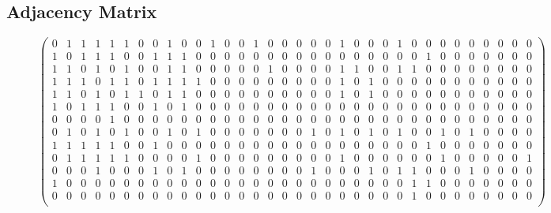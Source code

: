 \documentclass[runningheads]{llncs}
\begin{document}
\subsection{Adjacency Matrix}
\begin{figure}
\[\begin{pmatrix}
0 & 1 & 1 & 1 & 1 & 1 & 0 & 0 & 1 & 0 & 0 & 1 & 0 & 0 & 1 & 0 & 0 & 0 & 0 & 0 & 1 & 0 & 0 & 0 & 1 & 0 & 0 & 0 & 0 & 0 & 0 & 0 & 0 & 0 \\
1 & 0 & 1 & 1 & 1 & 0 & 0 & 1 & 1 & 1 & 0 & 0 & 0 & 0 & 0 & 0 & 0 & 0 & 0 & 0 & 0 & 0 & 0 & 0 & 0 & 0 & 1 & 0 & 0 & 0 & 0 & 0 & 0 & 0 \\
1 & 1 & 0 & 1 & 0 & 1 & 0 & 0 & 1 & 1 & 0 & 0 & 0 & 0 & 0 & 1 & 0 & 0 & 0 & 0 & 1 & 1 & 0 & 0 & 1 & 1 & 0 & 0 & 0 & 0 & 0 & 0 & 0 & 0 \\
1 & 1 & 1 & 0 & 1 & 1 & 0 & 1 & 1 & 1 & 1 & 0 & 0 & 0 & 0 & 0 & 0 & 0 & 0 & 0 & 1 & 0 & 1 & 0 & 0 & 0 & 0 & 0 & 0 & 0 & 0 & 0 & 0 & 0 \\
1 & 1 & 0 & 1 & 0 & 1 & 1 & 0 & 1 & 1 & 0 & 0 & 0 & 0 & 0 & 0 & 0 & 0 & 0 & 0 & 1 & 0 & 1 & 0 & 0 & 0 & 0 & 0 & 0 & 0 & 0 & 0 & 0 & 0 \\
1 & 0 & 1 & 1 & 1 & 0 & 0 & 1 & 0 & 1 & 0 & 0 & 0 & 0 & 0 & 0 & 0 & 0 & 0 & 0 & 0 & 0 & 0 & 0 & 0 & 0 & 0 & 0 & 0 & 0 & 0 & 0 & 0 & 0 \\
0 & 0 & 0 & 0 & 1 & 0 & 0 & 0 & 0 & 0 & 0 & 0 & 0 & 0 & 0 & 0 & 0 & 0 & 0 & 0 & 0 & 0 & 0 & 0 & 0 & 0 & 0 & 0 & 0 & 0 & 0 & 0 & 0 & 0 \\
0 & 1 & 0 & 1 & 0 & 1 & 0 & 0 & 1 & 0 & 1 & 0 & 0 & 0 & 0 & 0 & 0 & 0 & 1 & 0 & 1 & 0 & 1 & 0 & 1 & 0 & 0 & 1 & 0 & 1 & 0 & 0 & 0 & 0 \\
1 & 1 & 1 & 1 & 1 & 0 & 0 & 1 & 0 & 0 & 0 & 0 & 0 & 0 & 0 & 0 & 0 & 0 & 0 & 0 & 0 & 0 & 0 & 0 & 0 & 0 & 1 & 0 & 0 & 0 & 0 & 0 & 0 & 0 \\
0 & 1 & 1 & 1 & 1 & 1 & 0 & 0 & 0 & 0 & 1 & 0 & 0 & 0 & 0 & 0 & 0 & 0 & 0 & 0 & 1 & 0 & 0 & 0 & 0 & 0 & 0 & 1 & 0 & 0 & 0 & 0 & 0 & 1 \\
0 & 0 & 0 & 1 & 0 & 0 & 0 & 1 & 0 & 1 & 0 & 0 & 0 & 0 & 0 & 0 & 0 & 0 & 1 & 0 & 0 & 0 & 1 & 0 & 1 & 1 & 0 & 0 & 0 & 1 & 0 & 0 & 0 & 0 \\
1 & 0 & 0 & 0 & 0 & 0 & 0 & 0 & 0 & 0 & 0 & 0 & 0 & 0 & 0 & 0 & 0 & 0 & 0 & 0 & 0 & 0 & 0 & 0 & 0 & 1 & 1 & 0 & 0 & 0 & 0 & 0 & 0 & 0 \\
0 & 0 & 0 & 0 & 0 & 0 & 0 & 0 & 0 & 0 & 0 & 0 & 0 & 0 & 0 & 0 & 0 & 0 & 0 & 0 & 0 & 0 & 0 & 0 & 0 & 1 & 0 & 0 & 0 & 0 & 0 & 0 & 0 & 0 \\

\end{pmatrix}\]
\end{figure}
\end{document}
